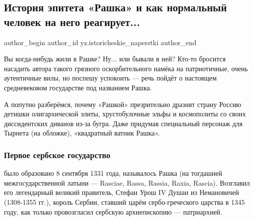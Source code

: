  
 
 
 
 
 
\subsection{История эпитета «Рашка» и как нормальный человек на него реагирует...}
\label{sec:04_02_2022.yz.istoricheskie_naperstki.1.rashka}
 
\ifcmt
 author_begin
   author_id yz.istoricheskie_naperstki
 author_end
\fi

Вы когда-нибудь жили в Рашке? Ну... или бывали в ней? Кто-то бросится насадить
автора такого грязного оскорбительного намёка на патриотичные, очень
аутентичные вилы, но поспешу успокоить — речь пойдёт о настоящем средневековом
государстве под названием Рашка.


А попутно разберёмся, почему «Рашкой» презрительно дразнят страну Россию
детишки олигархической элиты, хрустобулочные эльфы и космополиты со своих
диссидентских диванов из-за бугра. Даже придумав специальный персонаж для
Тырнета (на обложке), «квадратный ватник Рашка».

\subsubsection{Первое сербское государство}

было образовано 8 сентября 1331 года, называлось Рашка (на тогдашней
межгосударственной латыни — Rasciae, Rassa, Rassia, Raxia, Rascia). Возглавил
его легендарный великий правитель, Стефан Урош IV Душан из Немановичей
(1308-1355 гг.), король Сербии, ставший царём сербо-греческого царства в 1345
году, как только провозгласил сербскую архиепископию — патриархией.

